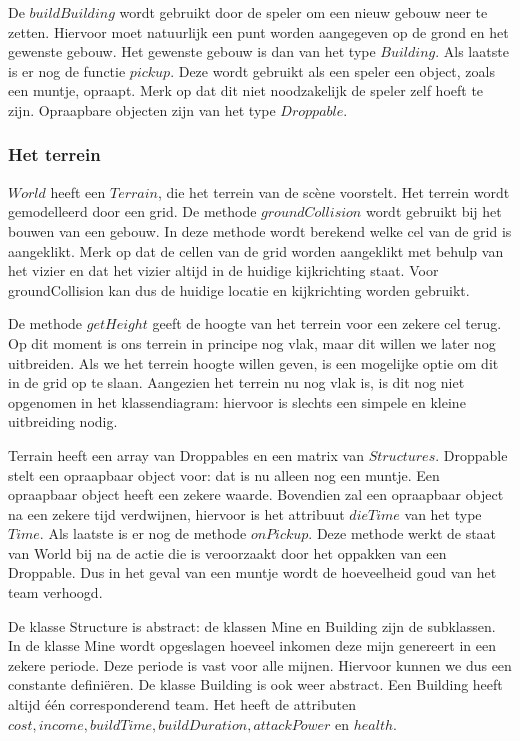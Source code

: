 \documentclass[a4paper,11pt, twoside]{article}
\begin{document}
De $buildBuilding$ wordt gebruikt door de speler om een nieuw gebouw neer te zetten. Hiervoor moet natuurlijk een punt worden aangegeven op de grond en het gewenste gebouw. Het gewenste gebouw is dan van het type $Building$. Als laatste is er nog de functie $pickup$. Deze wordt gebruikt als een speler een object, zoals een muntje, opraapt. Merk op dat dit niet noodzakelijk de speler zelf hoeft te zijn. Opraapbare objecten zijn van het type $Droppable$.

\subsubsection{Het terrein}
$World$ heeft een $Terrain$, die het terrein van de sc\`ene voorstelt. Het terrein wordt gemodelleerd door een grid. De methode $groundCollision$ wordt gebruikt bij het bouwen van een gebouw. In deze methode wordt berekend welke cel van de grid is aangeklikt. Merk op dat de cellen van de grid worden aangeklikt met behulp van het vizier en dat het vizier altijd in de huidige kijkrichting staat. Voor groundCollision kan dus de huidige locatie en kijkrichting worden gebruikt.

De methode $getHeight$ geeft de hoogte van het terrein voor een zekere cel terug. Op dit moment is ons terrein in principe nog vlak, maar dit willen we later nog uitbreiden. Als we het terrein hoogte willen geven, is een mogelijke optie om dit in de grid op te slaan. Aangezien het terrein nu nog vlak is, is dit nog niet opgenomen in het klassendiagram: hiervoor is slechts een simpele en kleine uitbreiding nodig.

Terrain heeft een array van Droppables en een matrix van $Structures$. Droppable stelt een opraapbaar object voor: dat is nu alleen nog een muntje. Een opraapbaar object heeft een zekere waarde. Bovendien zal een opraapbaar object na een zekere tijd verdwijnen, hiervoor is het attribuut $dieTime$ van het type $Time$. Als laatste is er nog de methode $onPickup$. Deze methode werkt de staat van World bij na de actie die is veroorzaakt door het oppakken van een Droppable. Dus in het geval van een muntje wordt de hoeveelheid goud van het team verhoogd.

De klasse Structure is abstract: de klassen Mine en Building zijn de subklassen. In de klasse Mine wordt opgeslagen hoeveel inkomen deze mijn genereert in een zekere periode. Deze periode is vast voor alle mijnen. Hiervoor kunnen we dus een constante defini\"eren. De klasse Building is ook weer abstract. Een Building heeft altijd \'e\'en corresponderend team. Het heeft de attributen $cost, income, buildTime, buildDuration, attackPower$ en $health$.
\end{document}
